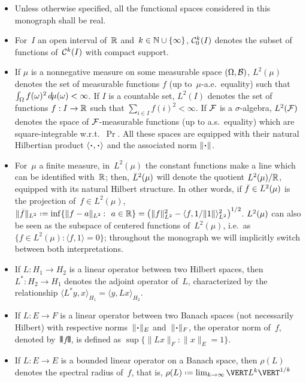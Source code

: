 \begin{itemize}
\item Unless otherwise specified, all the functional spaces considered in this monograph
shall be real.
%
\item For~$I$ an open interval of~$\mathbb{R}$ and~$k\in\mathbb{N}\cup\{\infty\}$,
$\mathcal{C}^k_0(I)$ denotes the subset of functions of~$\mathcal{C}^k(I)$ with compact support.
%
\item If $\mu$ is a nonnegative measure on some measurable space $(\Omega,\mathcal{B})$,
$L^2(\mu)$ denotes the set of measurable functions $f$ (up to~$\mu$-a.e.\ equality) such that
$\int_{\Omega} f(\omega)^2 \,\dx\mu(\omega) < \infty$.
If $I$ is a countable set, $L^2(I)$ denotes the set of functions $f : I\to\mathbb{R}$ such that
$\sum_{i\in I} f(i)^2 < \infty$.
If $\mathcal{F}$ is a $\sigma$-algebra, $L^2(\mathcal{F})$ denotes the space of
$\mathcal{F}$-measurable functions (up to a.s.\ equality)
which are square-integrable w.r.t.~$\Pr$.
All these spaces are equipped with their natural Hilbertian product
$\langle\Bcdot,\Bcdot\rangle$ and the associated norm $\|\Bcdot\|$.
%
\item For~$\mu$ a finite measure, in~$L^2(\mu)$ the constant functions make a line
which can be identified with~$\mathbb{R}$;
then, $\ldb(\mu)$ will denote the quotient $L^2(\mu)/\mathbb{R}$,
equipped with its natural Hilbert structure.
In other words, if $\bar{f}\in \ldb(\mu)$ is the projection of~$f\in L^2(\mu)$,
$\|\bar{f}\|_{\ldb} \coloneqq \inf\{\|f-a\|_{L^2}\colon {a\in\RR}\} =
\big( \|f\|_{L^2}^2 - \langle f,1/\|1\|\rangle_{L^2}^2 \big)^{1/2}$.
$\ldb(\mu)$ can also be seen as the subspace of centered functions of~$L^2(\mu)$,
i.e.\ as $\{ f\in L^2(\mu)\colon \langle f,1\rangle = 0 \}$;
throughout the monograph we will implicitly switch between both interpretations.
%
\item If $L \colon H_1\to H_2$ is a linear operator between two Hilbert spaces,
then $L^* \colon H_2\to H_1$ denotes the adjoint operator of~$L$, characterized by the relationship
$\langle L^*y, x \rangle_{H_1} = \langle y, Lx \rangle_{H_2}$.
%
\item If $L \colon E\to F$ is a linear operator between two Banach spaces
(not necessarily Hilbert) with respective norms~$\|\Bcdot\|_E$ and~$\|\Bcdot\|_F$,
the operator norm of~$f$, denoted by~$\VERT f\VERT$, is defined as
$\sup\{\|Lx\|_F\colon \|x\|_E=1\}$.
%
\item If $L \colon E\to E$ is a bounded linear operator on a Banach space,
then $\rho(L)$ denotes the spectral radius of~$f$, that is,
$\rho(L) \coloneqq \lim_{k\longto\infty} \VERT L^k \VERT^{1/k}$

\end{itemize}
